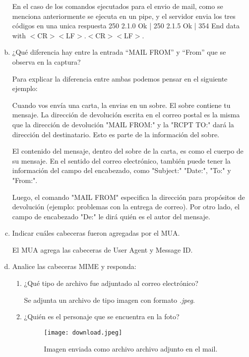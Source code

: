 \documentclass[osajnl,twocolumn,showpacs,superscriptaddress,10pt]{revtex4-1} %
\begin{document}
\begin{enumerate}[a)]
  En el caso de los comandos ejecutados para el envio de mail, como se menciona anteriormente se ejecuta en un pipe, y el servidor envia los tres códigos en una unica respuesta 250 2.1.0 Ok | 250 2.1.5 Ok | 354 End data with $<$CR$>$$<$LF$>$.$<$CR$>$$<$LF$>$. \\
  
  \item ¿Qué diferencia hay entre la entrada “MAIL FROM” y “From” que se observa en la captura?
  
  Para explicar la diferencia entre ambas podemos pensar en el siguiente ejemplo: 
  
  Cuando vos envía una carta, la envias en un sobre. El sobre contiene tu mensaje. La dirección de devolución escrita en el correo postal es la misma que la dirección de devolución "MAIL FROM:" y la "RCPT TO:" dará la dirección del destinatario. Esto es parte de la información del sobre.
  
  El contenido del mensaje, dentro del sobre de la carta, es como el cuerpo de su mensaje. En el sentido del correo electrónico, también puede tener la información del campo del encabezado, como "Subject:" "Date:", "To:" y "From:".

  Luego, el comando "MAIL FROM" especifica la dirección para propósitos de devolución (ejemplo: problemas con la entrega  de correo). Por otro lado, el campo de encabezado "De:" le dirá quién es el autor del mensaje. \\
  
  \item Indicar cuáles cabeceras fueron agregadas por el MUA.
  
  El MUA agrega las cabeceras de User Agent y Message ID. \\
  
  \item Analice las cabeceras MIME y responda:
  
  \begin{enumerate}[1)]
    \item ¿Qué tipo de archivo fue adjuntado al correo electrónico? 
    
    Se adjunta un archivo de tipo imagen con formato \textit{.jpeg}. \\
    
    \item ¿Quién es el personaje que se encuentra en la foto?
    
    \begin{figure}[H]
        \centering
        \texttt{[image: download.jpeg]}
        \caption{Imagen enviada como archivo archivo adjunto en el mail.}
    \end{figure}
  \end{enumerate}
\end{enumerate}
\end{document}
